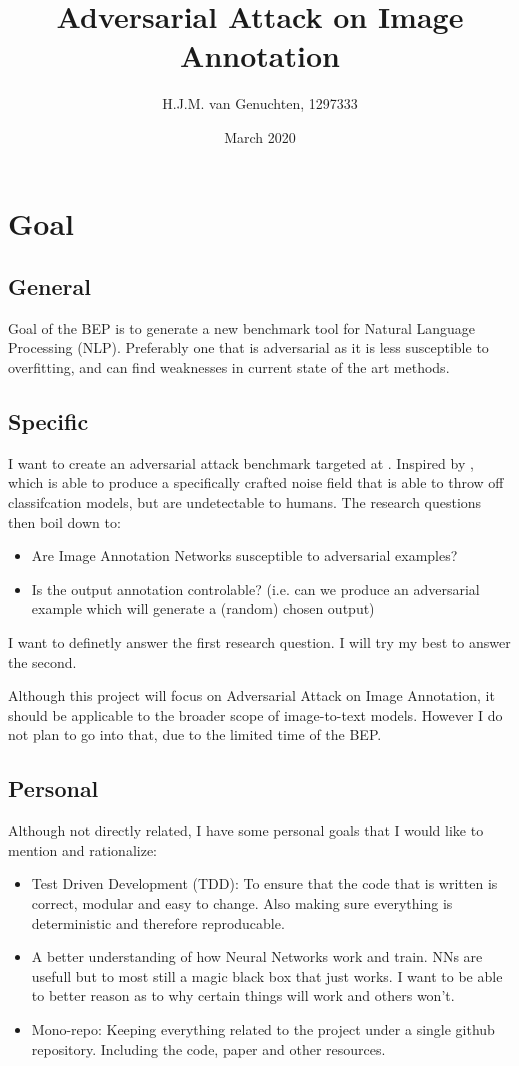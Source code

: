 \documentclass[12pt]{extarticle}
\title{Adversarial Attack on Image Annotation}
\author{H.J.M. van Genuchten, 1297333}
\date{March 2020}
\begin{document}
\maketitle

\section{ Goal}
\subsection{General}
Goal of the BEP is to generate a new benchmark tool for Natural Language Processing (NLP). Preferably one that is adversarial as it is less susceptible to overfitting, and can find weaknesses in current state of the art methods.

\subsection{Specific}
I want to create an adversarial attack benchmark targeted at \cite[image annotation]{venkatesh} . Inspired by \cite[Adversarial Examples]{goodfellow2015explaining}, which is able to produce a specifically crafted noise field that is able to throw off classifcation models, but are undetectable to humans. The research questions then boil down to:
\begin{itemize}
    \item Are Image Annotation Networks susceptible to adversarial examples?
    \item Is the output annotation controlable? (i.e. can we produce an adversarial example which will generate a (random) chosen output)
\end{itemize}

I want to definetly answer the first research question. I will try my best to answer the second.

Although this project will focus on Adversarial Attack on Image Annotation, it should be applicable to the broader scope of image-to-text models. However I do not plan to go into that, due to the limited time of the BEP.

\subsection{Personal}
Although not directly related, I have some personal goals that I would like to mention and rationalize:
\begin{itemize}
    \item  Test Driven Development (TDD): To ensure that the code that is written is correct, modular and easy to change. Also making sure everything is deterministic and therefore reproducable.
    \item  A better understanding of how Neural Networks work and train. NNs are usefull but to most still a magic black box that just works. I want to be able to better reason as to why certain things will work and others won't.
    \item  Mono-repo: Keeping everything related to the project under a single github repository. Including the code, paper and other resources.
\end{itemize}
\end{document}
